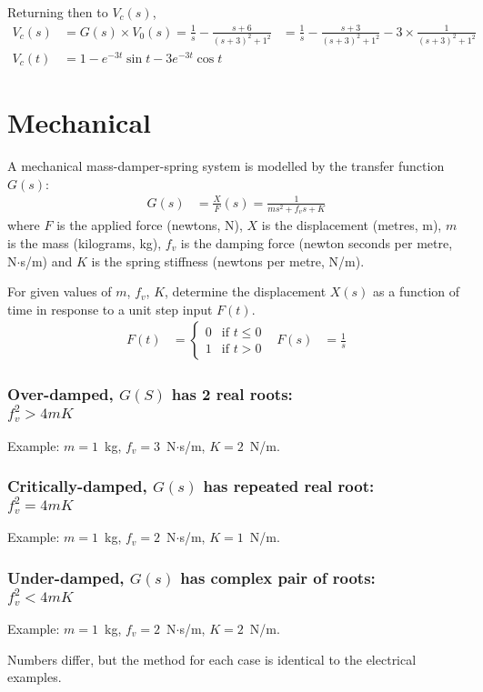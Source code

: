 \documentclass[a4paper,12pt]{article}
\begin{document}
Returning then to $V_c(s)$,
\begin{align*}
  V_c(s) &= G(s)\times V_0(s) = \frac{1}{s} - \frac{s+6}{(s+3)^2+1^2}
  & = \frac{1}{s} - \frac{s+3}{(s+3)^2+1^2} - 3\times \frac{1}{(s+3)^2+1^2} \\
  V_c(t) &= 1 - e^{-3t} \sin t - 3 e^{-3t} \cos t
\end{align*}

\newpage

\part{Mechanical}
A mechanical mass-damper-spring system is modelled by the transfer function $G(s)$:
\begin{align*}
  G(s) &= \frac{X}{F}(s) = \frac{1}{ms^2 + f_v s + K}
\end{align*}
where $F$ is the applied force (newtons, N), $X$ is the displacement (metres, m),
$m$ is the mass (kilograms, kg), $f_v$ is the damping force (newton seconds per metre, N$\cdot$s/m) and $K$ is the spring stiffness (newtons per metre, N/m).

For given values of $m$, $f_v$, $K$, determine the displacement $X(s)$ as a function of time in response to a unit step input $F(t)$.
\begin{align*}
  F(t) &= \begin{cases} 0 & \text{if } t \leq 0 \\ 1 & \text{if } t > 0 \end{cases} &
  F(s) &= \frac{1}{s}
\end{align*}

\section*{Over-damped, $G(S)$ has 2 real roots:\\ $f_v^2>4mK$}
Example: $m=1$~kg, $f_v=3$~N$\cdot$s/m, $K=2$~N/m. %
\section*{Critically-damped, $G(s)$ has repeated real root:\\$f_v^2=4mK$}
Example: $m=1$~kg, $f_v=2$~N$\cdot$s/m, $K=1$~N/m. %
\section*{Under-damped, $G(s)$ has complex pair of roots:\\$f_v^2<4mK$}
Example: $m=1$~kg, $f_v=2$~N$\cdot$s/m, $K=2$~N/m. %

Numbers differ, but the method for each case is identical to the electrical examples.
\end{document}
